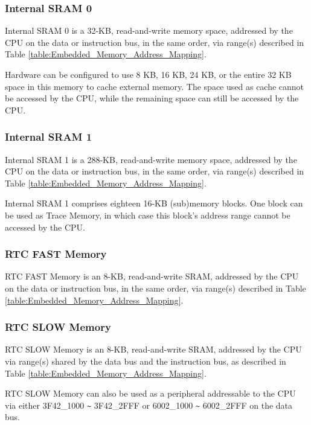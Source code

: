 \documentclass[main\_\_EN.tex]{subfiles}
\begin{document}
\subsubsection{Internal SRAM 0}\label{Internal SRAM 0}

Internal SRAM 0 is a 32-KB, read-and-write memory space, addressed by the CPU on the data or instruction bus, in the same order, via range(s) described in Table \ref{table:Embedded_Memory_Address_Mapping}.

Hardware can be configured to use 8 KB, 16 KB, 24 KB, or the entire 32 KB space in this memory to cache external memory. The space used as cache cannot be accessed by the CPU, while the remaining space can still be accessed by the CPU.


\subsubsection{Internal SRAM 1}

Internal SRAM 1 is a 288-KB, read-and-write memory space, addressed by the CPU on the data or instruction bus, in the same order, via range(s) described in Table \ref{table:Embedded_Memory_Address_Mapping}.

\hypertarget{Trace}{}
Internal SRAM 1 comprises eighteen 16-KB (sub)memory blocks. One block can be used as Trace Memory, in which case this block's address range cannot be accessed by the CPU.

\subsubsection{RTC FAST Memory}
\hypertarget{PRO_CPU_Only}{}
RTC FAST Memory is an 8-KB, read-and-write SRAM, addressed by the CPU on the data or instruction bus, in the same order, via range(s) described in Table \ref{table:Embedded_Memory_Address_Mapping}.

\subsubsection{RTC SLOW Memory}

RTC SLOW Memory is an 8-KB, read-and-write SRAM, addressed by the CPU via range(s) shared by the data bus and the instruction bus, as described in Table \ref{table:Embedded_Memory_Address_Mapping}.

RTC SLOW Memory can also be used as a peripheral addressable to the CPU via either \hexprefix{}3F42\_1000 \verb+~+ \hexprefix{}3F42\_2FFF or \hexprefix{}6002\_1000 \verb+~+ \hexprefix{}6002\_2FFF on the data bus.
\end{document}
